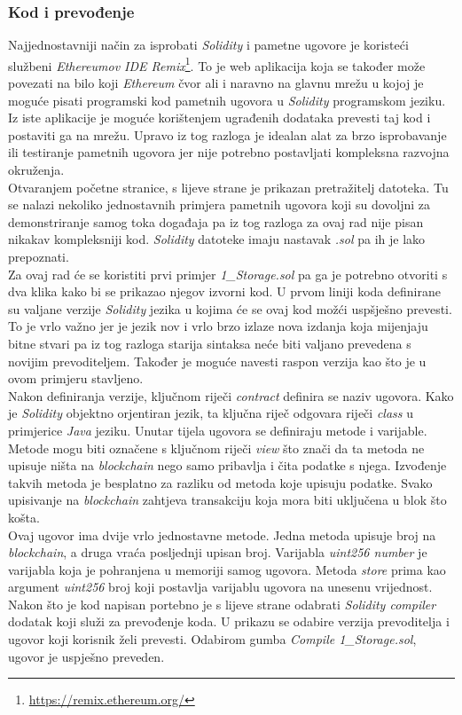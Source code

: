 \documentclass[times, utf8, zavrsni, numeric]{fer}
\begin{document}
\subsubsection{Kod i prevođenje}
Najjednostavniji način za isprobati \emph{Solidity} i pametne ugovore je koristeći službeni \emph{Ethereumov IDE Remix}\footnote{\url{https://remix.ethereum.org/}}. 
To je web aplikacija koja se također može povezati na bilo koji \emph{Ethereum} čvor ali i naravno na glavnu mrežu u kojoj je moguće pisati programski kod
pametnih ugovora u \emph{Solidity} programskom jeziku. Iz iste aplikacije je moguće korištenjem ugrađenih dodataka prevesti taj kod i postaviti ga na mrežu.
Upravo iz tog razloga je idealan alat za brzo isprobavanje ili testiranje pametnih ugovora jer nije potrebno postavljati kompleksna razvojna okruženja. \\
Otvaranjem početne stranice, s lijeve strane je prikazan pretražitelj datoteka. Tu se nalazi nekoliko jednostavnih primjera pametnih ugovora koji su dovoljni
za demonstriranje samog toka događaja pa iz tog razloga za ovaj rad nije pisan nikakav kompleksniji kod. \emph{Solidity} datoteke imaju nastavak \emph{.sol}
pa ih je lako prepoznati. \\
Za ovaj rad će se koristiti prvi primjer \emph{1\_Storage.sol} pa ga je potrebno otvoriti s dva klika kako bi se prikazao njegov izvorni kod.
U prvom liniji koda definirane su valjane verzije \emph{Solidity} jezika u kojima će se ovaj kod možći uspšješno prevesti. To je vrlo važno jer je jezik
nov i vrlo brzo izlaze nova izdanja koja mijenjaju bitne stvari pa iz tog razloga starija sintaksa neće biti valjano prevedena s novijim prevoditeljem. Također je moguće
navesti raspon verzija kao što je u ovom primjeru stavljeno. \\
Nakon definiranja verzije, ključnom riječi \emph{contract} definira se naziv ugovora. Kako je \emph{Solidity} objektno orjentiran jezik, ta ključna riječ odgovara 
riječi \emph{class} u primjerice \emph{Java} jeziku. Unutar tijela ugovora se definiraju metode i varijable. Metode mogu biti označene s ključnom riječi \emph{view} što
znači da ta metoda ne upisuje ništa na \emph{blockchain} nego samo pribavlja i čita podatke s njega. Izvođenje takvih metoda je besplatno za razliku od metoda koje
upisuju podatke. Svako upisivanje na \emph{blockchain} zahtjeva transakciju koja mora biti uključena u blok što košta. \\
Ovaj ugovor ima dvije vrlo jednostavne metode. Jedna metoda upisuje broj na \emph{blockchain}, a druga vraća posljednji upisan broj. 
Varijabla \emph{uint256 number} je varijabla koja je pohranjena u memoriji samog ugovora. Metoda \emph{store} prima kao argument \emph{uint256} broj koji postavlja 
varijablu ugovora na unesenu vrijednost. \\
Nakon što je kod napisan portebno je s lijeve strane odabrati \emph{Solidity compiler} dodatak koji služi za prevođenje koda. U prikazu se odabire verzija prevoditelja
i ugovor koji korisnik želi prevesti. Odabirom gumba \emph{Compile 1\_Storage.sol}, ugovor je uspješno preveden.
\end{document}
